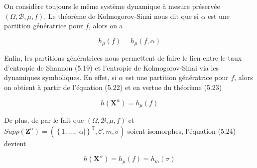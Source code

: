 \vspace{2ex}
On considère toujours le même système dynamique à mesure préservée $(\Omega, \mathcal{B},\mu,f)$. Le théorème de Kolmogorov-Sinai nous dit que si $\alpha$ est une partition génératrice pour $f$, alors on a

\begin{equation}
    h_{\mu}(f)=h_{\mu}(f,\alpha)
\end{equation}

Enfin, les partitions génératrices nous permettent de faire le lien entre le taux d'entropie de Shannon (5.19) et l'entropie de Kolmogorov-Sinai via les dynamiques symboliques. En effet, si $\alpha$ est une partition génératrice pour $f$, alors on obtient à partir de l'équation (5.22) et en vertue du théorème (5.23)

\begin{equation}
    h(\mathbf{X}^{\alpha})=h_{\mu}(f)
\end{equation}

De plus, de par le fait que $(\Omega, \mathcal{B},\mu,f)$ et $Supp(\mathbf{Z}^{\alpha})=(\left\{1,...,|\alpha|\right\}^\mathbb{T}, \mathcal{C}, m, \sigma)$ soient isomorphes, l'équation (5.24) devient

\begin{equation}
    h(\mathbf{X}^{\alpha})=h_{\mu}(f)=h_m(\sigma)
\end{equation}
